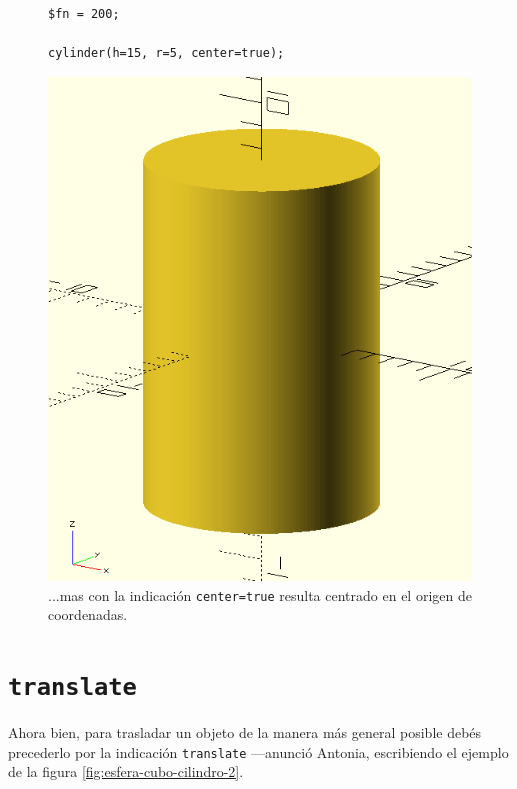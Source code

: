 \begin{figure}[ht]
  \begin{minipage}[]{.5\textwidth}
    \begin{lstlisting}
$fn = 200;
      
cylinder(h=15, r=5, center=true);
    \end{lstlisting}%
  \end{minipage}\hfill
   \begin{minipage}[]{.4\textwidth}
     \centering
     \includegraphics[width=.8\textwidth]{imagenes/cilindro-2}
   \end{minipage}
   \caption{...mas con la indicación \lstinline!center=true! resulta
     centrado en el origen de coordenadas.}
  \label{fig:cilindro-2}
\end{figure}


\section{\texttt{translate}}

\guillemotright Ahora bien, para trasladar un objeto de la manera
más general posible debés precederlo por la indicación
\lstinline!translate! ---anunció Antonia, escribiendo el ejemplo de la
figura \ref{fig:esfera-cubo-cilindro-2}.


